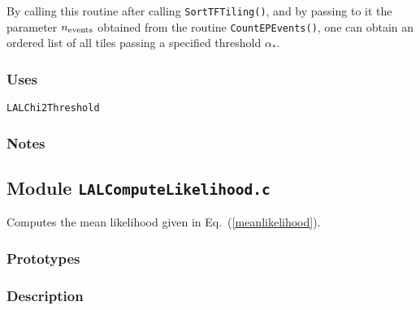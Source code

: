 By calling this routine after calling \verb+SortTFTiling()+, and by
passing to it the parameter $n_{\rm events}$ obtained from the routine
\verb+CountEPEvents()+, one can obtain an ordered list of all tiles
passing a specified threshold $\alpha_*$.

\subsubsection*{Uses}
\begin{verbatim}
LALChi2Threshold 
\end{verbatim}

\subsubsection*{Notes}

\vfill{\footnotesize}

\newpage
\subsection{Module \texttt{LALComputeLikelihood.c}}
\label{ss:LALComputeLikelihood.c}

Computes the mean likelihood given in Eq.\ (\ref{meanlikelihood}).

\subsubsection*{Prototypes}
\vspace{0.1in}


\subsubsection*{Description}

